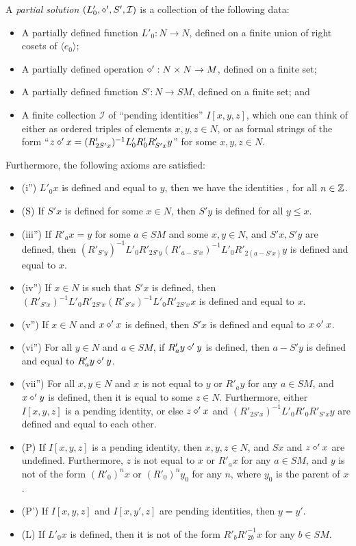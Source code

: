 \begin{definition}\label{part-sol}\leanok  A \emph{partial solution} $(L'_0, \diamond', S', {\mathcal I})$ is a collection of the following data:
\begin{itemize}
  \item A partially defined function $L'_0: N \to N$, defined on a finite union of right cosets of $\langle e_0\rangle$;
  \item A partially defined operation $\diamond': N \times N \to M$, defined on a finite set;
  \item A partially defined function $S': N \to SM$, defined on a finite set; and
  \item A finite collection ${\mathcal  I}$ of ``pending identities'' $I[x,y,z]$, which one can think of either as ordered triples of elements $x,y,z \in N$, or as formal strings of the form ``$z \diamond' x = (R'_{2S'x})^{-1} L'_0 R'_0 R'_{S'x} y$'' for some $x,y,z \in N$.
\end{itemize}

Furthermore, the following axioms are satisfied:
\begin{itemize}
  \item (i'')  $L'_0 x$ is defined and equal to $y$, then we have the identities ,  for all $n\in \mathbb{Z}$.
  \item (S) If $S'x$ is defined for some $x \in N$, then $S'y$ is defined for all $y \leq x$.
  \item (iii'') If $R'_a x = y$ for some $a \in SM$ and some $x,y \in N$, and $S'x, S'y$ are defined, then $(R'_{S'y})^{-1} L'_0 R'_{2S'y} (R'_{a-S'x})^{-1} L'_0 R'_{2(a-S'x)} y$ is defined and equal to $x$.
  \item (iv'') If $x \in N$ is such that $S'x$ is defined, then $(R'_{S'x})^{-1} L'_0 R'_{2S'x} (R'_{S'x})^{-1} L'_0 R'_{2S'x} x$ is defined and equal to $x$.
  \item (v'')  If $x \in N$ and $x \diamond' x$ is defined, then $S'x$ is defined and equal to $x \diamond' x$.
  \item (vi'')  For all $y \in N$ and $a \in SM$, if $R'_a y \diamond' y$ is defined, then $a - S'y$ is defined and equal to $R'_a y \diamond' y$.
  \item (vii'')  For all $x,y \in N$ and $x$ is not equal to $y$ or $R'_a y$ for any $a \in SM$, and $x \diamond' y$ is defined, then it is equal to some $z \in N$.  Furthermore, either $I[x,y,z]$ is a pending identity, or else $z \diamond' x$ and $(R'_{2S'x})^{-1} L'_0 R'_0 R'_{S'x} y$ are defined and equal to each other.
  \item (P) If $I[x,y,z]$ is a pending identity, then $x,y,z \in N$, and $Sx$ and $z \diamond' x$ are undefined.  Furthermore, $z$ is not equal to $x$ or $R'_a x$ for any $a \in SM$, and $y$ is not of the form $(R'_0)^n x$ or $(R'_0)^n y_0$ for any $n$, where $y_0$ is the parent of $x$.
  \item (P') If $I[x,y,z]$ and $I[x,y',z]$ are pending identities, then $y=y'$.
  \item (L) If $L'_0 x$ is defined, then it is not of the form $R'_b R'_{2b}^{-1} x$ for any $b \in SM$.
\end{itemize}


\end{definition}
